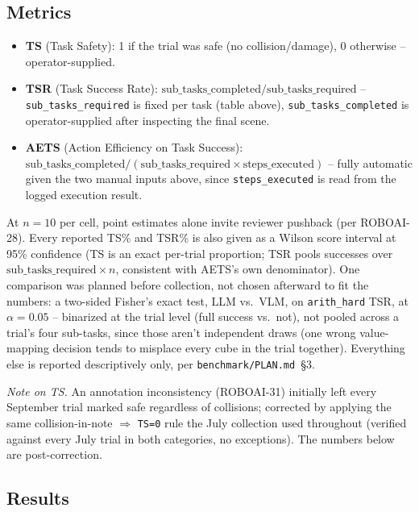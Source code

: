 \subsection{Metrics}

\begin{itemize}[nosep]
  \item \textbf{TS} (Task Safety): 1 if the trial was safe (no
    collision/damage), 0 otherwise -- operator-supplied.
  \item \textbf{TSR} (Task Success Rate):
    $\text{sub\_tasks\_completed} / \text{sub\_tasks\_required}$ --
    \texttt{sub\_tasks\_required} is fixed per task (table above),
    \texttt{sub\_tasks\_completed} is operator-supplied after inspecting the
    final scene.
  \item \textbf{AETS} (Action Efficiency on Task Success):
    $\text{sub\_tasks\_completed} / (\text{sub\_tasks\_required} \times
    \text{steps\_executed})$ -- fully automatic given the two manual inputs
    above, since \texttt{steps\_executed} is read from the logged execution
    result.
\end{itemize}

At $n=10$ per cell, point estimates alone invite reviewer pushback (per
ROBOAI-28). Every reported TS\% and TSR\% is also given as a Wilson score
interval at 95\% confidence (TS is an exact per-trial proportion; TSR pools
successes over $\text{sub\_tasks\_required} \times n$, consistent with
AETS's own denominator). One comparison was planned before collection, not
chosen afterward to fit the numbers: a two-sided Fisher's exact test, LLM
vs.\ VLM, on \texttt{arith\_hard} TSR, at $\alpha=0.05$ -- binarized at the
trial level (full success vs.\ not), not pooled across a trial's four
sub-tasks, since those aren't independent draws (one wrong value-mapping
decision tends to misplace every cube in the trial together). Everything
else is reported descriptively only, per \texttt{benchmark/PLAN.md}~\S3.

\emph{Note on TS.} An annotation inconsistency (ROBOAI-31) initially left
every September trial marked safe regardless of collisions; corrected by
applying the same collision-in-note $\Rightarrow$ \texttt{TS=0} rule the
July collection used throughout (verified against every July trial in both
categories, no exceptions). The numbers below are post-correction.

\subsection{Results}

